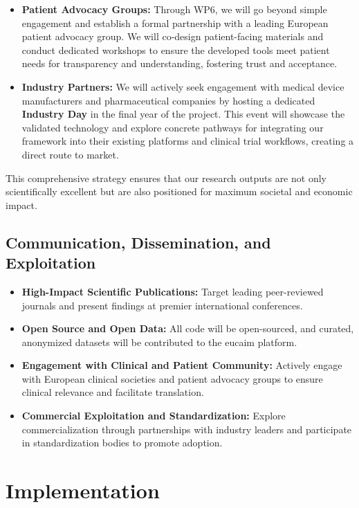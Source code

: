 \documentclass[11pt, a4paper]{article}
\begin{document}
\begin{itemize}
\begin{itemize}
        \item \textbf{Patient Advocacy Groups:} Through WP6, we will go beyond simple engagement and establish a formal partnership with a leading European patient advocacy group. We will co-design patient-facing materials and conduct dedicated workshops to ensure the developed tools meet patient needs for transparency and understanding, fostering trust and acceptance.
        \item \textbf{Industry Partners:} We will actively seek engagement with medical device manufacturers and pharmaceutical companies by hosting a dedicated \textbf{Industry Day} in the final year of the project. This event will showcase the validated technology and explore concrete pathways for integrating our framework into their existing platforms and clinical trial workflows, creating a direct route to market.
    \end{itemize}
\end{itemize}
This comprehensive strategy ensures that our research outputs are not only scientifically excellent but are also positioned for maximum societal and economic impact.

\subsection{Communication, Dissemination, and Exploitation}
\begin{itemize}
    \item \textbf{High-Impact Scientific Publications:} Target leading peer-reviewed journals and present findings at premier international conferences.
    \item \textbf{Open Source and Open Data:} All code will be open-sourced, and curated, anonymized datasets will be contributed to the \gls{eucaim} platform.
    \item \textbf{Engagement with Clinical and Patient Community:} Actively engage with European clinical societies and patient advocacy groups to ensure clinical relevance and facilitate translation.
    \item \textbf{Commercial Exploitation and Standardization:} Explore commercialization through partnerships with industry leaders and participate in standardization bodies to promote adoption.
\end{itemize}

\section{Implementation}
\end{document}
